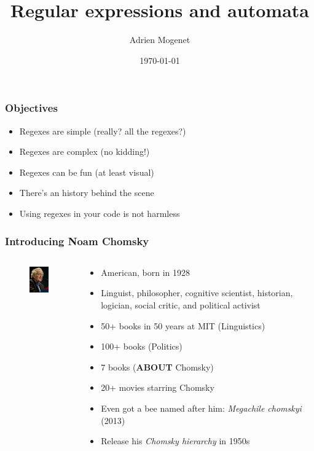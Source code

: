 \documentclass[aspectratio=169,xcolor=table]{beamer}
\title[Regexes and automata]{ Regular expressions and automata}
\author{Adrien Mogenet}
\institute[CS]{ContentSquare
  \medskip
  \textit{am@csq.io}
}
\date{\today}
\begin{document}
\begin{frame}
  \titlepage
\end{frame}




\begin{frame}
  \frametitle{Objectives}
  \begin{itemize}
    \item Regexes are simple (really? all the regexes?)
    \item Regexes are complex (no kidding!)
    \item Regexes can be fun (at least visual)
    \item There's an history behind the scene
    \item Using regexes in your code is not harmless
  \end{itemize}
\end{frame}


\begin{frame}
  \frametitle{Introducing Noam Chomsky}
  \begin{columns}[T]
    \begin{column}{.3\textwidth}
        \begin{figure}[h]
        \includegraphics[width=100px]{images/chomsky.jpg}
        \end{figure}
    \end{column}
    \begin{column}{.7\textwidth}
      \begin{itemize}
      \item American, born in 1928 \pause
      \item Linguist, philosopher, cognitive scientist, historian,
        logician, social critic, and political activist \pause
      \item 50+ books in 50 years at MIT (Linguistics) \pause
      \item 100+ books (Politics) \pause
      \item 7 books (\textbf{ABOUT} Chomsky) \pause
      \item 20+ movies starring Chomsky \pause
      \item Even got a bee named after him: \textit{Megachile
          chomskyi} (2013) \pause
      \item Release his \textit{Chomsky hierarchy} in 1950s \pause
      \end{itemize}
    \end{column}
  \end{columns}
\end{frame}
\end{document}
